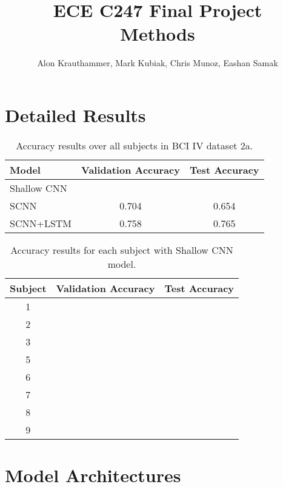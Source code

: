 \documentclass{article}
\author{Alon Krauthammer, Mark Kubiak, Chris Munoz, Eashan Samak}
\title{ECE C247 Final Project\\
Methods}
\begin{document}
\maketitle

\section{Detailed Results}
\begin{table}[ht]
\begin{center}
\begin{tabular}{|l|c|c|}
\hline
Model           & Validation Accuracy & Test Accuracy   \\
\hline\hline
Shallow CNN     &                     &                 \\
SCNN            & 0.704               & 0.654           \\
SCNN+LSTM       & 0.758               & 0.765           \\
\hline
\end{tabular}
\end{center}
\caption{Accuracy results over all subjects in BCI IV dataset 2a.}
\label{tab:acc}
\end{table}

\begin{table}[ht]
\begin{center}
    \begin{tabular}{|c|c|c|}
        \hline
        Subject & Validation Accuracy   & Test Accuracy \\
        \hline\hline
        1       &   &   \\
        2       &   &   \\
        3       &   &   \\
        5       &   &   \\
        6       &   &   \\
        7       &   &   \\
        8       &   &   \\
        9       &   &   \\
        \hline
    \end{tabular}
\end{center}
\caption{Accuracy results for each subject with Shallow CNN model.}
\label{tab:subj}
\end{table}


\section{Model Architectures}
\end{document}

